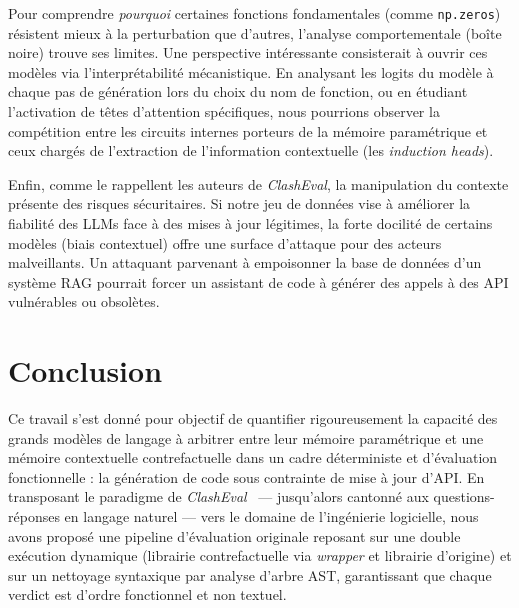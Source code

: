 \documentclass[11pt, a4paper]{article}
\begin{document}
Pour comprendre \textit{pourquoi} certaines fonctions fondamentales (comme \texttt{np.zeros}) résistent mieux à la perturbation que d'autres, l'analyse comportementale (boîte noire) trouve ses limites. Une perspective intéressante consisterait à ouvrir ces modèles via l'interprétabilité mécanistique. En analysant les logits du modèle à chaque pas de génération lors du choix du nom de fonction, ou en étudiant l'activation de têtes d'attention spécifiques, nous pourrions observer la compétition entre les circuits internes porteurs de la mémoire paramétrique et ceux chargés de l'extraction de l'information contextuelle (les \textit{induction heads}). 

Enfin, comme le rappellent les auteurs de \textit{ClashEval}, la manipulation du contexte présente des risques sécuritaires. Si notre jeu de données vise à améliorer la fiabilité des LLMs face à des mises à jour légitimes, la forte docilité de certains modèles (biais contextuel) offre une surface d'attaque pour des acteurs malveillants. Un attaquant parvenant à empoisonner la base de données d'un système RAG pourrait forcer un assistant de code à générer des appels à des API vulnérables ou obsolètes.



\section{Conclusion}
Ce travail s'est donné pour objectif de quantifier rigoureusement la capacité des grands modèles de langage à arbitrer entre leur mémoire paramétrique et une mémoire contextuelle contrefactuelle dans un cadre déterministe et d'évaluation fonctionnelle : la génération de code sous contrainte de mise à jour d'API. En transposant le paradigme de \textit{ClashEval}~\cite{clasheval2024} --- jusqu'alors cantonné aux questions-réponses en langage naturel --- vers le domaine de l'ingénierie logicielle, nous avons proposé une pipeline d'évaluation originale reposant sur une double exécution dynamique (librairie contrefactuelle via \textit{wrapper} et librairie d'origine) et sur un nettoyage syntaxique par analyse d'arbre AST, garantissant que chaque verdict est d'ordre fonctionnel et non textuel.
\end{document}
